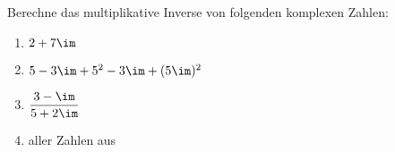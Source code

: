 \begin{exercise}
  Berechne das multiplikative Inverse von folgenden komplexen Zahlen:
  \begin{enumerate}[label=(\alph*)]
  \item $2 + 7\im$
  \item $5 - 3\im + 5^2 - 3\im + (5\im)^2$
  \item $\displaystyle\frac{3-\im}{5+2\im}$
  \item aller Zahlen aus 
  \end{enumerate}
\end{exercise}
